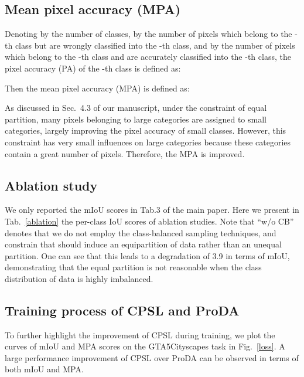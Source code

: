 \documentclass[10pt,twocolumn,letterpaper]{article}
\begin{document}
	\subsection{Mean pixel accuracy (MPA)}
	Denoting by  the number of classes, by  the number of pixels which belong to the -th class but are wrongly classified into the -th class, and by  the number of pixels which belong to the -th class and are accurately classified into the -th class, the pixel accuracy (PA) of the -th class is defined as:
	
	Then the mean pixel accuracy (MPA) is defined as:
	
	As discussed in Sec.~4.3 of our manuscript, under the constraint of equal partition, many pixels belonging to large categories are assigned to small categories, largely improving the pixel accuracy of small classes. However, this constraint has very small influences on large categories because these categories contain a great number of pixels. Therefore, the MPA is improved. 
	
	\subsection{Ablation study}
	We only reported the mIoU scores in Tab.3 of the main paper. Here we present in Tab.~\ref{ablation} the per-class IoU scores of ablation studies. Note that ``w/o CB'' denotes that we do not employ the class-balanced sampling techniques, and constrain that  should induce an equipartition of data rather than an unequal partition. One can see that this leads to a degradation of 3.9 in terms of mIoU, demonstrating that the equal partition is not reasonable when the class distribution of data is highly imbalanced. 
	
	
	
	\subsection{Training process of CPSL and ProDA}
	To further highlight the improvement of CPSL during training, we plot the curves of mIoU and MPA scores on the GTA5Cityscapes task in Fig.~\ref{loss}. A large performance improvement of CPSL over ProDA can be observed in terms of both mIoU and MPA.  
	
	
\end{document}
